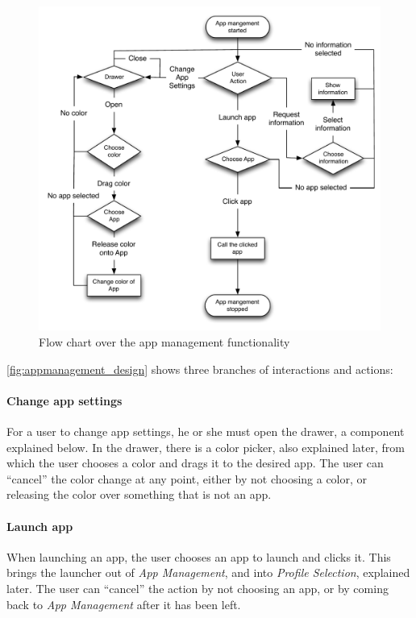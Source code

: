 \begin{figure}[!h]
	\centering
	\includegraphics[width=1\textwidth]{gfx/appmanagement.pdf}
	\caption{Flow chart over the app management functionality}
	\label{fig:appmanagement_design}
\end{figure}

\autoref{fig:appmanagement_design} shows three branches of interactions and actions:

\paragraph{Change app settings} For a user to change app settings, he or she must open the drawer, a component explained below. 
In the drawer, there is a color picker, also explained later, from which the user chooses a color and drags it to the desired app. 
The user can ``cancel'' the color change at any point, either by not choosing a color, or releasing the color over something that is not an app. 

\paragraph{Launch app} When launching an app, the user chooses an app to launch and clicks it. 
This brings the launcher out of \emph{App Management}, and into \emph{Profile Selection}, explained later. 
The user can ``cancel'' the action by not choosing an app, or by coming back to \emph{App Management} after it has been left.

